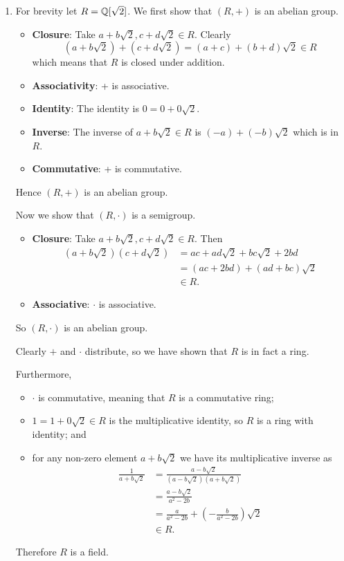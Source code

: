 \begin{enumerate}
    \item For brevity let $R = \mathbb{Q}[\sqrt2]$. We first show that $(R,+)$ is an abelian group.
    \begin{itemize}
        \item \textbf{Closure}: Take $a+b\sqrt2, c+d\sqrt2 \in R$. Clearly
        \[
            (a+b\sqrt2) + (c+d\sqrt2) = (a+c) + (b+d)\sqrt2 \in R
        \]
        which means that $R$ is closed under addition.
        \item \textbf{Associativity}: + is associative.
        \item \textbf{Identity}: The identity is $0 = 0 + 0\sqrt2$.
        \item \textbf{Inverse}: The inverse of $a+b\sqrt2 \in R$ is $(-a) + (-b)\sqrt2$ which is in $R$.
        \item \textbf{Commutative}: + is commutative.
    \end{itemize}
    Hence $(R, +)$ is an abelian group.

    Now we show that $(R, \cdot)$ is a semigroup.
    \begin{itemize}
        \item \textbf{Closure}: Take $a+b\sqrt2, c+d\sqrt2 \in R$. Then
        \begin{align*}
            (a+b\sqrt2)(c+d\sqrt2) &= ac + ad\sqrt2 + bc\sqrt2 + 2bd\\
            &= (ac+2bd) + (ad+bc)\sqrt2\\
            &\in R.
        \end{align*}
        \item \textbf{Associative}: $\cdot$ is associative.
    \end{itemize}
    So $(R, \cdot)$ is an abelian group.

    Clearly $+$ and $\cdot$ distribute, so we have shown that $R$ is in fact a ring.

    Furthermore,
    \begin{itemize}
        \item $\cdot$ is commutative, meaning that $R$ is a commutative ring;
        \item $1 = 1 + 0\sqrt2 \in R$ is the multiplicative identity, so $R$ is a ring with identity; and
        \item for any non-zero element $a+b\sqrt2$ we have its multiplicative inverse as
        \begin{align*}
            \frac{1}{a+b\sqrt2} &= \frac{a-b\sqrt2}{(a-b\sqrt2)(a+b\sqrt2)}\\
            &= \frac{a-b\sqrt2}{a^2-2b}\\
            &= \frac{a}{a^2-2b} + \left(-\frac{b}{a^2-2b}\right)\sqrt2\\
            &\in R.
        \end{align*}
    \end{itemize}
    Therefore $R$ is a field.


\end{enumerate}
